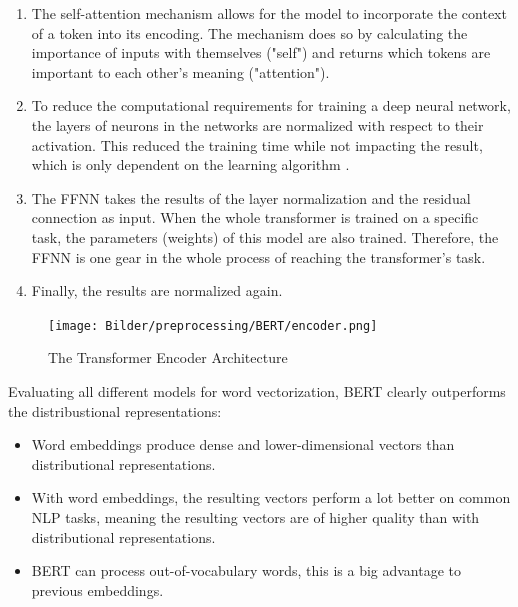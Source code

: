                \begin{enumerate}
               	\item The self-attention mechanism allows for the model to incorporate the context of a token into its encoding. The mechanism does so by calculating the importance of inputs with themselves ("self") and returns which tokens are important to each other's meaning ("attention").
               	\item To reduce the computational requirements for training a deep neural network, the layers of neurons in the networks are normalized with respect to their activation. This reduced the training time while not impacting the result, which is only dependent on the learning algorithm \cite{baLayerNormalization2016}.
               	\item The \ac{FFNN} takes the results of the layer normalization and the residual connection as input. When the whole transformer is trained on a specific task, the parameters (weights) of this model are also trained. Therefore, the \ac{FFNN} is one gear in the whole process of reaching the transformer's task.
               	\item Finally, the results are normalized again.
               \end{enumerate}
       			
       			 \begin{figure}[h!]
       				\label{fig:encoder}
       				\centering
       				\texttt{[image: Bilder/preprocessing/BERT/encoder.png]}
       				\caption[The Transformer Encoder Architecture]{The Transformer Encoder Architecture  \cite{illustratedTransformer}}
       			\end{figure}
			
            
            Evaluating all different models for word vectorization, BERT clearly outperforms the distribustional representations:
            \begin{itemize}
            	\item Word embeddings produce dense and lower-dimensional vectors than distributional representations.
            	\item With word embeddings, the resulting vectors perform a lot better on common \ac{NLP} tasks, meaning the resulting vectors are of higher quality than with distributional representations.
            	\item BERT can process out-of-vocabulary words, this is a big advantage to previous embeddings.
            \end{itemize}

